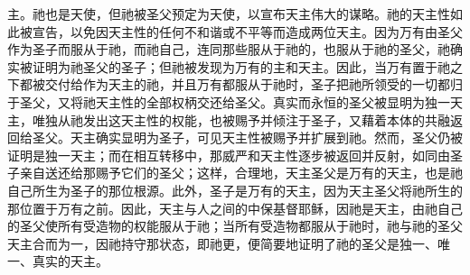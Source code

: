 主。祂也是天使，但祂被圣父预定为天使，以宣布天主伟大的谋略。祂的天主性如此被宣告，以免因天主性的任何不和谐或不平等而造成两位天主。因为万有由圣父作为圣子而服从于祂，而祂自己，连同那些服从于祂的，也服从于祂的圣父，祂确实被证明为祂圣父的圣子；但祂被发现为万有的主和天主。因此，当万有置于祂之下都被交付给作为天主的祂，并且万有都服从于祂时，圣子把祂所领受的一切都归于圣父，又将祂天主性的全部权柄交还给圣父。真实而永恒的圣父被显明为独一天主，唯独从祂发出这天主性的权能，也被赐予并倾注于圣子，又藉着本体的共融返回给圣父。天主确实显明为圣子，可见天主性被赐予并扩展到祂。然而，圣父仍被证明是独一天主；而在相互转移中，那威严和天主性逐步被返回并反射，如同由圣子亲自送还给那赐予它们的圣父；这样，合理地，天主圣父是万有的天主，也是祂自己所生为圣子的那位根源。此外，圣子是万有的天主，因为天主圣父将祂所生的那位置于万有之前。因此，天主与人之间的中保基督耶稣，因祂是天主，由祂自己的圣父使所有受造物的权能服从于祂；当所有受造物都服从于祂时，祂与祂的圣父天主合而为一，因祂持守那状态，即祂更，便简要地证明了祂的圣父是独一、唯一、真实的天主。\par

